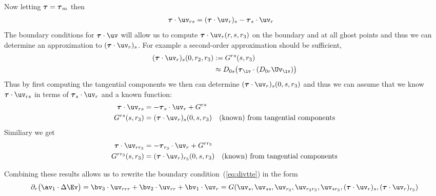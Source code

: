 \documentclass[10pt]{article}
\newcommand{\rb}{{r_2}}%
\newcommand{\rc}{{r_3}}%
\newcommand{\dra}{{\Delta r_1}}%
\begin{document}
Now letting $\boldsymbol{\tau}=\boldsymbol{\tau}_m$ then
\begin{align*}
   \tauv\cdot\uv_{rs} &= (\tauv\cdot\uv_r)_s - \tauv_s\cdot\uv_r
\end{align*}
The boundary conditions for $\tauv\cdot\uv$ will allow us to compute $\tauv\cdot\uv_r(r,s,\rc)$
on the boundary and at all ghost points  and thus we
can determine an approximation to $(\tauv\cdot\uv_r)_s$. For example a second-order approximation
should be sufficient,
\begin{align*}
  (\tauv\cdot\uv_r)_s(0,\rb,\rc) &:= G^{rs}(s,\rc) \\
                                &\approx D_{0s}\big( \tauv_\iv\cdot (D_{0r}\Uv_\iv) \big)
\end{align*}
Thus by first computing the tangential components we then can determine $(\tauv\cdot\uv_r)_s(0,s,\rc)$ and thus
we can assume that we know $\tauv\cdot\uv_{rs}$ in terms of $\tauv_s\cdot\uv_r$ and a known function:
\begin{align*}
\tauv\cdot\uv_{rs} &= - \tauv_s\cdot\uv_r + G^{rs} \\
                 G^{rs}(s,\rc) &= (\tauv\cdot\uv_r)_s(0,s,\rc) \quad\mbox{(known) from tangential components}
\end{align*}
Similiary we get
\begin{align*}
\tauv\cdot\uv_{r\rc} &= - \tauv_\rc\cdot\uv_r + G^{r\rc} \\
                 G^{r\rc}(s,\rc) &= (\tauv\cdot\uv_r)_\rc(0,s,\rc) \quad\mbox{(known) from tangential components}
\end{align*}

Combining these results allows us to rewrite
the boundary condition~(\ref{eq:divtte}) in the form 
\begin{equation}
  \partial_r\big(\av_1\cdot \Delta\Ev \big) =
    \bv_3\cdot\uv_{rrr} + \bv_2\cdot\uv_{rr} + \bv_1\cdot\uv_{r} 
        = G(\uv_s,\uv_{ss},\uv_\rc,\uv_{\rc\rc},\uv_{s\rc}, (\tauv\cdot\uv_r)_s, (\tauv\cdot\uv_r)_\rc)
\end{equation}
\end{document}
